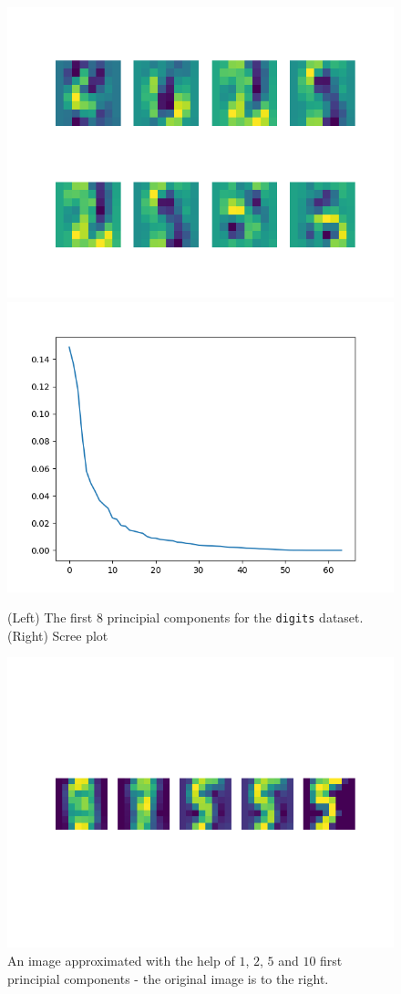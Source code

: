 \documentclass{article}
\begin{document}
\begin{figure}
    \centering
    \includegraphics[width=.54\linewidth]{graphics/digits_components.png}\includegraphics[width=.45\linewidth]{graphics/digits_scree.png}
    \caption{(Left) The first $8$ principial components for the \texttt{digits} dataset. (Right) Scree plot}
    \label{fig:digits_components}
\end{figure}


\begin{figure}
    \centering
    \includegraphics[width=.75\linewidth]{graphics/digits_approximations.png}
    \caption{An image approximated with the help of $1$, $2$, $5$ and $10$ first principial components - the original image is to the right.}
    \label{fig:digits_approx}
\end{figure}
\end{document}

